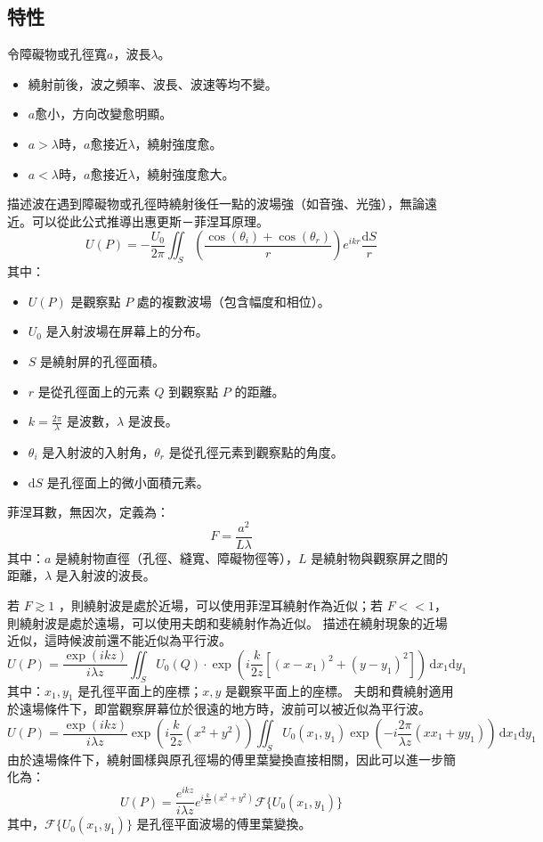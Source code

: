 \documentclass[a4paper,12pt]{report}
\begin{document}
\subsection{特性}
令障礙物或孔徑寬$a$，波長$\lambda$。
\begin{itemize}
\item 繞射前後，波之頻率、波長、波速等均不變。
\item $a$愈小，方向改變愈明顯。
\item $a>\lambda$時，$a$愈接近$\lambda$，繞射強度愈。
\item $a<\lambda$時，$a$愈接近$\lambda$，繞射強度愈大。
\end{itemize}
描述波在遇到障礙物或孔徑時繞射後任一點的波場強（如音強、光強），無論遠近。可以從此公式推導出惠更斯－菲涅耳原理。
\[
U(P) = -\frac{U_0}{2\pi} \iint_S \left(\frac{\cos(\theta_i) + \cos(\theta_r)}{r} \right) e^{ikr} \frac{\mathrm{d}S}{r}
\]
其中：
\begin{itemize}
\item \( U(P) \) 是觀察點 \( P \) 處的複數波場（包含幅度和相位）。
\item \( U_0 \) 是入射波場在屏幕上的分布。
\item \( S \) 是繞射屏的孔徑面積。
\item  \( r \) 是從孔徑面上的元素 \( Q \) 到觀察點 \( P \) 的距離。
\item  \( k = \frac{2\pi}{\lambda} \) 是波數，\( \lambda \) 是波長。
\item  \( \theta_i \) 是入射波的入射角，\( \theta_r \) 是從孔徑元素到觀察點的角度。
\item  \( \mathrm{d}S \) 是孔徑面上的微小面積元素。
\end{itemize}
菲涅耳數，無因次，定義為：
\[ F=\frac{a^2}{L\lambda}\]
其中：$a$ 是繞射物直徑（孔徑、縫寬、障礙物徑等），$L$ 是繞射物與觀察屏之間的距離，$\lambda$ 是入射波的波長。

若 $F\gtrsim 1$ ，則繞射波是處於近場，可以使用菲涅耳繞射作為近似；若 $F << 1$，則繞射波是處於遠場，可以使用夫朗和斐繞射作為近似。
描述在繞射現象的近場近似，這時候波前還不能近似為平行波。
\[
U(P) = \frac{\exp(ikz)}{i\lambda z} \iint_{S} U_0(Q) \cdot \exp \left( i \frac{k}{2z} \left[ (x - x_1)^2 + (y - y_1)^2 \right] \right) \,\mathrm{d}x_1 \mathrm{d}y_1
\]
其中：\( x_1, y_1 \) 是孔徑平面上的座標；\( x, y \) 是觀察平面上的座標。
夫朗和費繞射適用於遠場條件下，即當觀察屏幕位於很遠的地方時，波前可以被近似為平行波。
\[
U(P) = \frac{\exp(ikz)}{i\lambda z} \exp(i \frac{k}{2z}(x^2 + y^2)) \iint_{S} U_0(x_1, y_1) \exp(-i \frac{2\pi}{\lambda z} (x x_1 + y y_1)) \,\mathrm{d}x_1 \mathrm{d}y_1
\]
由於遠場條件下，繞射圖樣與原孔徑場的傅里葉變換直接相關，因此可以進一步簡化為：
\[
U(P) = \frac{e^{ikz}}{i\lambda z} e^{i \frac{k}{2z}(x^2 + y^2)} \mathcal{F}\{U_0(x_1, y_1)\} 
\]
其中，\(\mathcal{F}\{U_0(x_1, y_1)\}\) 是孔徑平面波場的傅里葉變換。
\end{document}
